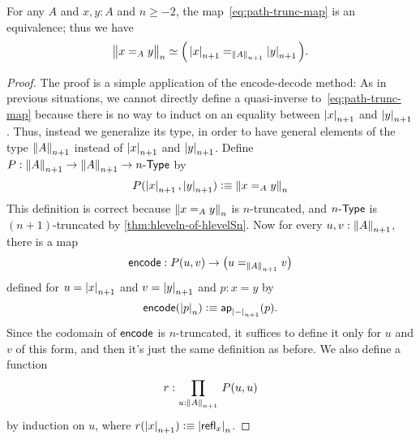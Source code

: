 \begin{thm} \label{thm:path-truncation}
  For any $A$ and $x,y:A$ and $n\ge -2$, the map~\eqref{eq:path-trunc-map} is an equivalence; thus we have
  \[ \eqv{\ttrunc n{x=_Ay}}{\Big(\tproj {n+1}x=_{\trunc{n+1}A}\tproj {n+1}y\Big)}. \]
\end{thm}

\begin{proof}
  The proof is a simple application of the encode-decode method: 
  As in previous situations, we cannot directly define a quasi-inverse to~\eqref{eq:path-trunc-map} because there is no way to induct on an
equality between $\tproj {n+1}x$ and $\tproj {n+1}y$.
  Thus, instead we generalize its type, in order to have general elements of the type $\trunc{n+1}A$ instead of $\tproj {n+1}x$ and $\tproj
{n+1}y$.
  Define $P:\trunc {n+1}A\to\trunc {n+1}A\to\typele{n}$ by
  \[P(\tproj {n+1}x,\tproj {n+1}y)\defeq \trunc n{x=_Ay}\]
  This definition is correct because $\trunc n{x=_Ay}$ is $n$-truncated, and $\typele{n}$ is $(n+1)$-truncated by
\autoref{thm:hleveln-of-hlevelSn}.
  Now for every $u,v:\trunc{n+1}A$, there is a map
  \[\encode:P(u,v) \to \big(u=_{\trunc{n+1}A}v\big)\]
  defined for $u=\tproj {n+1}x$ and $v=\tproj {n+1}y$ and $p:x=y$ by
  \[\encode(\tproj n{p})\defeq \apfunc{\tproj{n+1}-} (p).\]
  Since the codomain of $\encode$ is $n$-truncated, it suffices to define it only for $u$ and $v$ of this form, and then it's just the same
definition as before.
  We also define a function
  \[ r : \prd{u:\trunc{n+1} A} P(u,u) \]
  by induction on $u$, where $r(\tproj{n+1} x) \defeq \tproj n {\refl x}$.


\end{proof}
